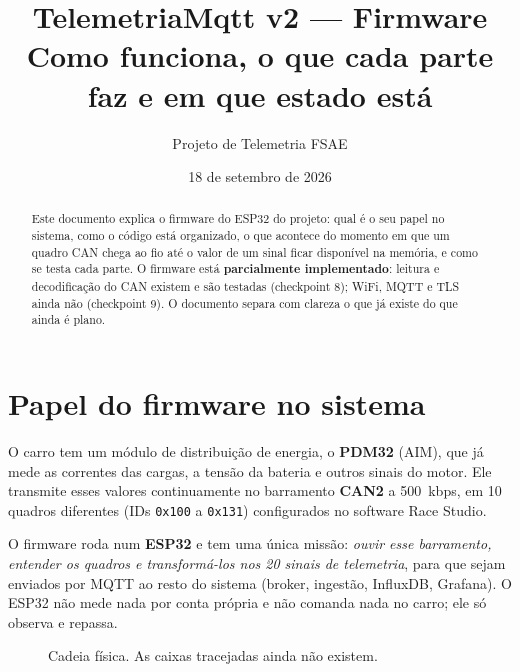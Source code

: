 \documentclass[11pt,a4paper]{article}
\title{\textbf{TelemetriaMqtt v2 --- Firmware} \\[4pt]
\large Como funciona, o que cada parte faz e em que estado está}
\author{Projeto de Telemetria FSAE}
\date{18 de setembro de 2026}
\begin{document}
\maketitle

\begin{abstract}
\noindent Este documento explica o firmware do ESP32 do projeto: qual é o seu papel no sistema, como o código está organizado, o que acontece do momento em que um quadro CAN chega ao fio até o valor de um sinal ficar disponível na memória, e como se testa cada parte. O firmware está \textbf{parcialmente implementado}: leitura e decodificação do CAN existem e são testadas (checkpoint 8); WiFi, MQTT e TLS ainda não (checkpoint 9). O documento separa com clareza o que já existe do que ainda é plano.
\end{abstract}

\tableofcontents

\section{Papel do firmware no sistema}

O carro tem um módulo de distribuição de energia, o \textbf{PDM32} (AIM), que já mede as correntes das cargas, a tensão da bateria e outros sinais do motor. Ele transmite esses valores continuamente no barramento \textbf{CAN2} a 500~kbps, em 10 quadros diferentes (IDs \texttt{0x100} a \texttt{0x131}) configurados no software Race Studio.

O firmware roda num \textbf{ESP32} e tem uma única missão: \emph{ouvir esse barramento, entender os quadros e transformá-los nos 20 sinais de telemetria}, para que sejam enviados por MQTT ao resto do sistema (broker, ingestão, InfluxDB, Grafana). O ESP32 não mede nada por conta própria e não comanda nada no carro; ele só observa e repassa.

\begin{figure}[h]
\centering
{}
\caption{Cadeia física. As caixas tracejadas ainda não existem.}
\end{figure}
\end{document}
